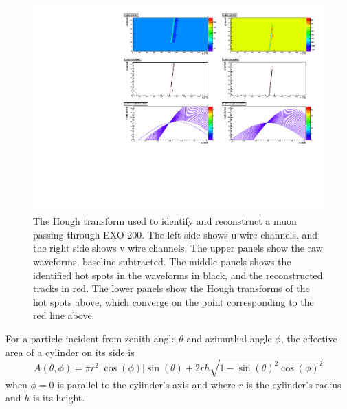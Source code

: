 \documentclass[herrin-thesis.tex]{subfiles}
\begin{document}
\begin{figure}[htbp]
\centering
\includegraphics[width=1\columnwidth]{./plots/muon_houghtransform_run_4685_ev_67.pdf}
\caption[Identifying a muon with the Hough tranform]{The Hough transform used to identify and reconstruct a muon passing through EXO-200. The left side shows u wire channels, and the right side shows v wire channels. The upper panels show the raw waveforms, baseline subtracted. The middle panels shows the identified hot spots in the waveforms in black, and the reconstructed tracks in red. The lower panels show the Hough transforms of the hot spots above, which converge on the point corresponding to the red line above.}
\label{fig:muon:houghtransform}
\end{figure}

For a particle incident from zenith angle \(\theta\) and azimuthal angle \(\phi\), the effective area of a cylinder on its side is
\begin{equation}
A(\theta,\phi) = \pi r^2 |\cos(\phi)|\sin(\theta) + 2 r h \sqrt{1-\sin(\theta)^2 \cos(\phi)^2}
\end{equation}
when \(\phi=0\) is parallel to the cylinder's axis and where \(r\) is the cylinder's radius and \(h\) is its height.
\end{document}
